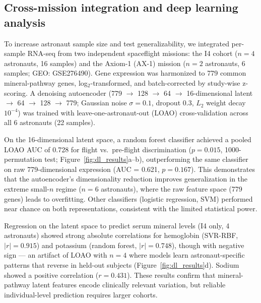 \documentclass[11pt,a4paper]{article}
\begin{document}
\subsection{Cross-mission integration and deep learning analysis}

To increase astronaut sample size and test generalizability, we integrated per-sample RNA-seq from two independent spaceflight missions: the I4 cohort ($n = 4$ astronauts, 16 samples) and the Axiom-1 (AX-1) mission ($n = 2$ astronauts, 6 samples; GEO: GSE276490). Gene expression was harmonized to 779 common mineral-pathway genes, log$_2$-transformed, and batch-corrected by study-wise z-scoring. A denoising autoencoder (779 $\to$ 128 $\to$ 64 $\to$ 16-dimensional latent $\to$ 64 $\to$ 128 $\to$ 779; Gaussian noise $\sigma = 0.1$, dropout 0.3, $L_2$ weight decay $10^{-4}$) was trained with leave-one-astronaut-out (LOAO) cross-validation across all 6 astronauts (22 samples).

On the 16-dimensional latent space, a random forest classifier achieved a pooled LOAO AUC of 0.728 for flight vs.\ pre-flight discrimination ($p = 0.015$, 1000-permutation test; Figure~\ref{fig:dl_results}a--b), outperforming the same classifier on raw 779-dimensional expression (AUC = 0.621, $p = 0.167$). This demonstrates that the autoencoder's dimensionality reduction improves generalization in the extreme small-$n$ regime ($n = 6$ astronauts), where the raw feature space (779 genes) leads to overfitting. Other classifiers (logistic regression, SVM) performed near chance on both representations, consistent with the limited statistical power.

Regression on the latent space to predict serum mineral levels (I4 only, 4 astronauts) showed strong absolute correlations for hemoglobin (SVR-RBF, $|r| = 0.915$) and potassium (random forest, $|r| = 0.748$), though with negative sign --- an artifact of LOAO with $n = 4$ where models learn astronaut-specific patterns that reverse in held-out subjects (Figure~\ref{fig:dl_results}d). Sodium showed a positive correlation ($r = 0.431$). These results confirm that mineral-pathway latent features encode clinically relevant variation, but reliable individual-level prediction requires larger cohorts.
\end{document}
